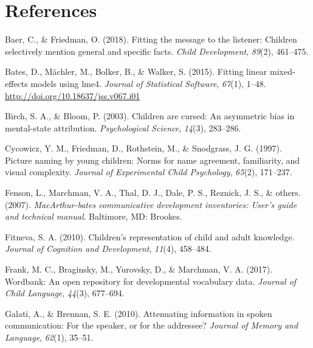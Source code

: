 \documentclass[10pt, letterpaper]{article}
\begin{document}
\vspace{1em} 

\hypertarget{references}{%
\section{References}\label{references}}

\setlength{\parindent}{-0.1in} 
\setlength{\leftskip}{0.125in}

\noindent

\hypertarget{refs}{}
\leavevmode\hypertarget{ref-baer2018}{}%
Baer, C., \& Friedman, O. (2018). Fitting the message to the listener:
Children selectively mention general and specific facts. \emph{Child
Development}, \emph{89}(2), 461--475.

\leavevmode\hypertarget{ref-bates2015}{}%
Bates, D., Mächler, M., Bolker, B., \& Walker, S. (2015). Fitting linear
mixed-effects models using lme4. \emph{Journal of Statistical Software},
\emph{67}(1), 1--48. \url{http://doi.org/10.18637/jss.v067.i01}

\leavevmode\hypertarget{ref-birch2003}{}%
Birch, S. A., \& Bloom, P. (2003). Children are cursed: An asymmetric
bias in mental-state attribution. \emph{Psychological Science},
\emph{14}(3), 283--286.

\leavevmode\hypertarget{ref-cycowicz1997}{}%
Cycowicz, Y. M., Friedman, D., Rothstein, M., \& Snodgrass, J. G.
(1997). Picture naming by young children: Norms for name agreement,
familiarity, and visual complexity. \emph{Journal of Experimental Child
Psychology}, \emph{65}(2), 171--237.

\leavevmode\hypertarget{ref-fenson2007}{}%
Fenson, L., Marchman, V. A., Thal, D. J., Dale, P. S., Reznick, J. S.,
\& others. (2007). \emph{MacArthur-bates communicative development
inventories: User's guide and technical manual}. Baltimore, MD: Brookes.

\leavevmode\hypertarget{ref-fitneva2010}{}%
Fitneva, S. A. (2010). Children's representation of child and adult
knowledge. \emph{Journal of Cognition and Development}, \emph{11}(4),
458--484.

\leavevmode\hypertarget{ref-frank2017}{}%
Frank, M. C., Braginsky, M., Yurovsky, D., \& Marchman, V. A. (2017).
Wordbank: An open repository for developmental vocabulary data.
\emph{Journal of Child Language}, \emph{44}(3), 677--694.

\leavevmode\hypertarget{ref-galati2010}{}%
Galati, A., \& Brennan, S. E. (2010). Attenuating information in spoken
communication: For the speaker, or for the addressee? \emph{Journal of
Memory and Language}, \emph{62}(1), 35--51.
\end{document}
